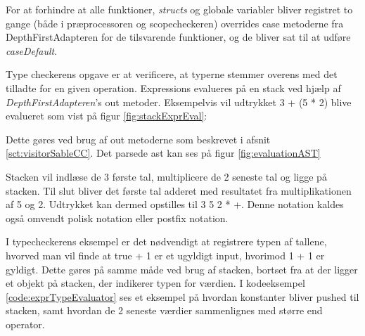 \noindent For at forhindre at alle funktioner, \textit{structs} og globale variabler bliver registret to gange (både i præprocessoren og scopecheckeren) overrides case metoderne fra DepthFirstAdapteren for de tilsvarende funktioner, og de bliver sat til at udføre \textit{caseDefault}.

Type checkerens opgave er at verificere, at typerne stemmer overens med det tilladte for en given operation. 
Expressions evalueres på en stack ved hjælp af \textit{DepthFirstAdapteren}'s out metoder. Eksempelvis vil udtrykket 3 + (5 * 2) blive evalueret som vist på figur \ref{fig:stackExprEval}:


\noindent Dette gøres ved brug af out metoderne som beskrevet i afsnit \ref{sct:visitorSableCC}. Det parsede \gls{ast} kan ses på figur \ref{fig:evaluationAST}

Stacken vil indlæse de 3 første tal, multiplicere de 2 seneste tal og ligge på stacken. Til slut bliver det første tal adderet med resultatet fra multiplikationen af 5 og 2. Udtrykket kan dermed opstilles til 3 5 2 * +. Denne notation kaldes også omvendt polisk notation \cite{CraftingCompiler_2009} eller postfix notation.

I typecheckerens eksempel er det nødvendigt at registrere typen af tallene, hvorved man vil finde at true + 1 er et ugyldigt input, hvorimod 1 + 1 er gyldigt. Dette gøres på samme måde ved brug af stacken, bortset fra at der ligger et objekt på stacken, der indikerer typen for værdien. I kodeeksempel \ref{code:exprTypeEvaluator} ses et eksempel på hvordan konstanter bliver pushed til stacken, samt hvordan de 2 seneste værdier sammenlignes med større end operator.  

